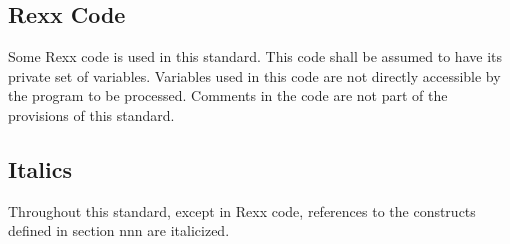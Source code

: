 \hypertarget{rexx-code}{%
\subsection{Rexx Code}\label{rexx-code}}

Some Rexx code is used in this standard. This code shall be assumed to
have its private set of variables. Variables used in this code are not
directly accessible by the program to be processed. Comments in the code
are not part of the provisions of this standard.

\hypertarget{italics}{%
\subsection{Italics}\label{italics}}

Throughout this standard, except in Rexx code, references to the
constructs defined in section nnn are italicized.
